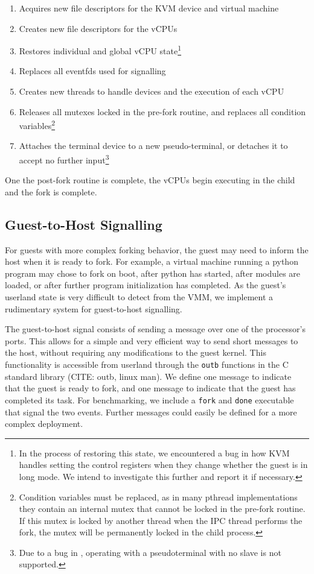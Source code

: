 \begin{enumerate}
\item Acquires new file descriptors for the KVM device and virtual machine
\item Creates new file descriptors for the vCPUs
\item Restores individual and global vCPU state\footnote{In the process of
restoring this state, we encountered a bug in how KVM handles setting the
control registers when they change whether the guest is in long mode. We intend
to investigate this further and report it if necessary.}
\item Replaces all eventfds used for signalling
\item Creates new threads to handle devices and the execution of each vCPU
\item Releases all mutexes locked in the pre-fork routine, and replaces all
condition variables\footnote{Condition variables must be replaced, as in many
pthread implementations they contain an internal mutex that cannot be locked in
the pre-fork routine. If this mutex is locked by another thread when the IPC
thread performs the fork, the mutex will be permanently locked in the child
process.}
\item Attaches the terminal device to a new pseudo-terminal, or detaches it to
accept no further input\footnote{Due to a bug in \kvmtool{}, operating with a
pseudoterminal with no slave is not supported.}
\end{enumerate}

One the post-fork routine is complete, the vCPUs begin executing in the child
and the fork is complete.

\subsection{Guest-to-Host Signalling}

For guests with more complex forking behavior, the guest may need to inform the
host when it is ready to fork. For example, a virtual machine running a python
program may chose to fork on boot, after python has started, after modules are
loaded, or after further program initialization has completed. As the guest's
userland state is very difficult to detect from the VMM, we implement a
rudimentary system for guest-to-host signalling.

The guest-to-host signal consists of sending a message over one of the
processor's ports. This allows for a simple and very efficient way to send short
messages to the host, without requiring any modifications to the guest kernel.
This functionality is accessible from userland through the \texttt{outb}
functions in the C standard library (CITE: outb, linux man). We define one
message to indicate that the guest is ready to fork, and one message to indicate
that the guest has completed its task. For benchmarking, we include a
\texttt{fork} and \texttt{done} executable that signal the two events. Further
messages could easily be defined for a more complex deployment.


